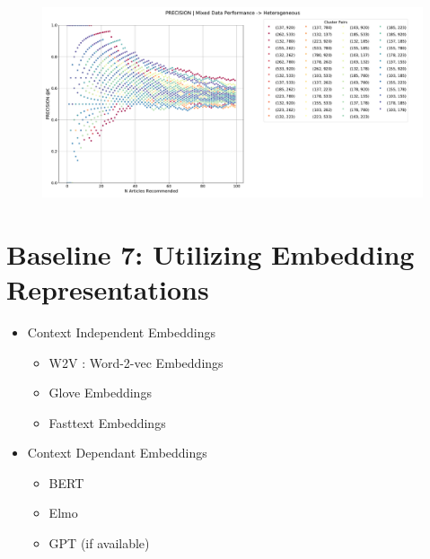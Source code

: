 \documentclass[a4paper,fontsize=8.0pt]{scrartcl}
\begin{document}
\begin{figure}[H]
 \includegraphics[width=1.0\textwidth]{Graphs/user_interaction_vs_model_performance_precision_all_cps_mixed_data_Heterogeneous.pdf}
\end{figure}

\vspace{1ex}
\section{Baseline 7: Utilizing Embedding Representations}
\begin{flushleft}
\begin{itemize}
    \item Context Independent Embeddings
    \begin{itemize}
         \item W2V : Word-2-vec Embeddings
        \item Glove Embeddings
        \item Fasttext Embeddings 
    \end{itemize}
    \item Context Dependant Embeddings
    \begin{itemize}
        \item BERT
        \item Elmo
        \item GPT (if available)
    \end{itemize}
\end{itemize}
\end{flushleft}
\end{document}
